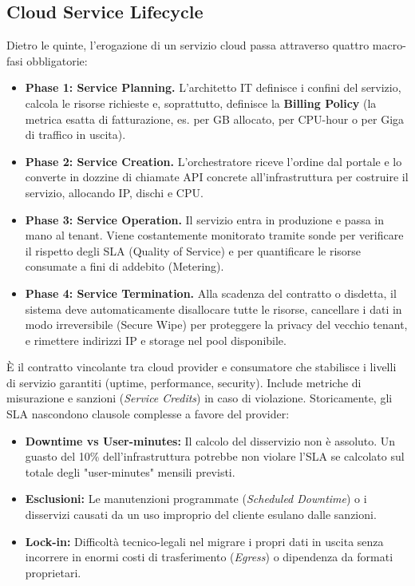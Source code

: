 \subsection{Cloud Service Lifecycle}
Dietro le quinte, l'erogazione di un servizio cloud passa attraverso quattro macro-fasi obbligatorie:
\begin{itemize}
    \item \textbf{Phase 1: Service Planning.} L'architetto IT definisce i confini del servizio, calcola le risorse richieste e, soprattutto, definisce la \textbf{Billing Policy} (la metrica esatta di fatturazione, es. per GB allocato, per CPU-hour o per Giga di traffico in uscita).
    \item \textbf{Phase 2: Service Creation.} L'orchestratore riceve l'ordine dal portale e lo converte in dozzine di chiamate API concrete all'infrastruttura per costruire il servizio, allocando IP, dischi e CPU.
    \item \textbf{Phase 3: Service Operation.} Il servizio entra in produzione e passa in mano al tenant. Viene costantemente monitorato tramite sonde per verificare il rispetto degli SLA (Quality of Service) e per quantificare le risorse consumate a fini di addebito (Metering).
    \item \textbf{Phase 4: Service Termination.} Alla scadenza del contratto o disdetta, il sistema deve automaticamente disallocare tutte le risorse, cancellare i dati in modo irreversibile (Secure Wipe) per proteggere la privacy del vecchio tenant, e rimettere indirizzi IP e storage nel pool disponibile.
\end{itemize}

\begin{definitionbox}
È il contratto vincolante tra cloud provider e consumatore che stabilisce i livelli di servizio garantiti (uptime, performance, security). Include metriche di misurazione e sanzioni (\textit{Service Credits}) in caso di violazione. Storicamente, gli SLA nascondono clausole complesse a favore del provider: 
\begin{itemize}
    \item \textbf{Downtime vs User-minutes:} Il calcolo del disservizio non è assoluto. Un guasto del 10\% dell'infrastruttura potrebbe non violare l'SLA se calcolato sul totale degli "user-minutes" mensili previsti.
    \item \textbf{Esclusioni:} Le manutenzioni programmate (\textit{Scheduled Downtime}) o i disservizi causati da un uso improprio del cliente esulano dalle sanzioni.
    \item \textbf{Lock-in:} Difficoltà tecnico-legali nel migrare i propri dati in uscita senza incorrere in enormi costi di trasferimento (\textit{Egress}) o dipendenza da formati proprietari.
\end{itemize}
\end{definitionbox}

